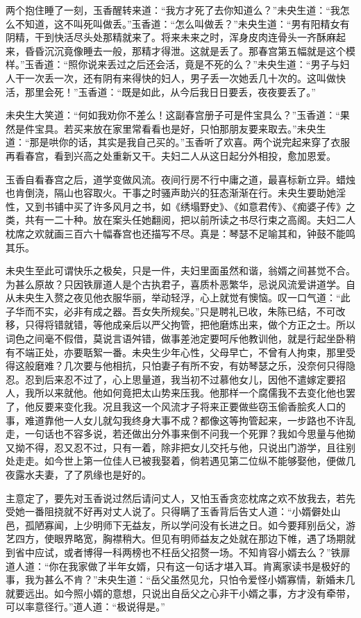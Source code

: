 \documentclass[a4paper,12pt,UTF8,twoside]{ctexbook}
\begin{document}
两个抱住睡了一刻，玉香醒转来道：“我方才死了去你知道么？”未央生道：“我怎么不知道，这不叫死叫做丢。”玉香道：“怎么叫做丢？”未央生道：“男有阳精女有阴精，干到快活尽头处那精就来了。将来未来之时，浑身皮肉连骨头一齐酥麻起来，昏昏沉沉竟像睡去一般，那精才得泄。这就是丢了。那春宫第五幅就是这个模样。”玉香道：“照你说来丢过之后还会活，竟是不死的么？”未央生道：“男子与妇人干一次丢一次，还有阴有来得快的妇人，男子丢一次她丢几十次的。这叫做快活，那里会死！”玉香道：“既是如此，从今后我日日要丢，夜夜要丢了。”

未央生大笑道：“何如我劝你不差么！这副春宫册子可是件宝具么？”玉香道：“果然是件宝具。若买来放在家里常看看也是好，只怕那朋友要来取去。”未央生道：“那是哄你的话，其实是我自己买的。”玉香听了欢喜。两个说完起来穿了衣服再看春宫，看到兴高之处重新又干。夫妇二人从这日起分外相投，愈加恩爱。

玉香自看春宫之后，道学变做风流。夜间行房不行中庸之道，最喜标新立异。蜡烛也肯倒浇，隔山也容取火。干事之时骚声助兴的狂态渐渐在行。未央生要助她淫性，又到书铺中买了许多风月之书，如《绣塌野史》、《如意君传》、《痴婆子传》之类，共有一二十种。放在案头任她翻阅，把以前所读之书尽行束之高阁。夫妇二人枕席之欢就画三百六十幅春宫也还描写不尽。真是：琴瑟不足喻其和，钟鼓不能鸣其乐。

未央生至此可谓快乐之极矣，只是一件，夫妇里面虽然和谐，翁婿之间甚觉不合。为甚么原故？只因铁扉道人是个古执君子，喜质朴恶繁华，忌说风流爱讲道学。自从未央生入赘之夜见他衣服华丽，举动轻浮，心上就觉有懊恼。叹一口气道：“此子华而不实，必非有成之器。吾女失所规矣。”只是聘礼已收，朱陈已结，不可改移，只得将错就错，等他成亲后以严父拘管，把他磨炼出来，做个方正之士。所以词色之间毫不假借，莫说言语舛错，做事差池定要呵斥他教训他，就是行起坐卧稍有不端正处，亦要聒絮一番。未央生少年心性，父母早亡，不曾有人拘束，那里受得这般磨难？几次要与他相抗，只怕妻子有所不安，有妨琴瑟之乐，没奈何只得隐忍。忍到后来忍不过了，心上思量道，我当初不过慕他女儿，因他不遣嫁定要招人，我所以来就他。他如何竟把太山势来压我。他那样一个腐儒我不去变化他也罢了，他反要来变化我。况且我这一个风流才子将来正要做些窃玉偷香脍炙人口的事，难道靠他一人女儿就勾我终身大事不成？都像这等拘管起来，一步路也不许乱走，一句话也不容多说，若还做出分外事来倒不问我一个死罪？我如今思量与他拗又拗不得，忍又忍不过，只有一着，除非把女儿交托与他，只说出门游学，且往别处走走。如今世上第一位佳人已被我娶着，倘若遇见第二位纵不能够娶他，便做几夜露水夫妻，了了夙缘也是好的。

主意定了，要先对玉香说过然后请问丈人，又怕玉香贪恋枕席之欢不放我去，若先受她一番阻挠就不好再对丈人说了。只得瞒了玉香背后告丈人道：“小婿僻处山邑，孤陋寡闻，上少明师下无益友，所以学问没有长进之日。如今要拜别岳父，游艺四方，使眼界略宽，胸襟稍大。但见有明师益友之处就在那边下帷，遇了场期就到省中应试，或者博得一科两榜也不枉岳父招赘一场。不知肯容小婿去么？”铁扉道人道：“你在我家做了半年女婿，只有这一句话才堪入耳。肯离家读书是极好的事，我为甚么不肯？”未央生道：“岳父虽然见允，只怕令爱怪小婿寡情，新婚未几就要远出。如今照小婿的意想，只说出自岳父之心非干小婿之事，方才没有牵带，可以率意径行。”道人道：“极说得是。”
\end{document}
